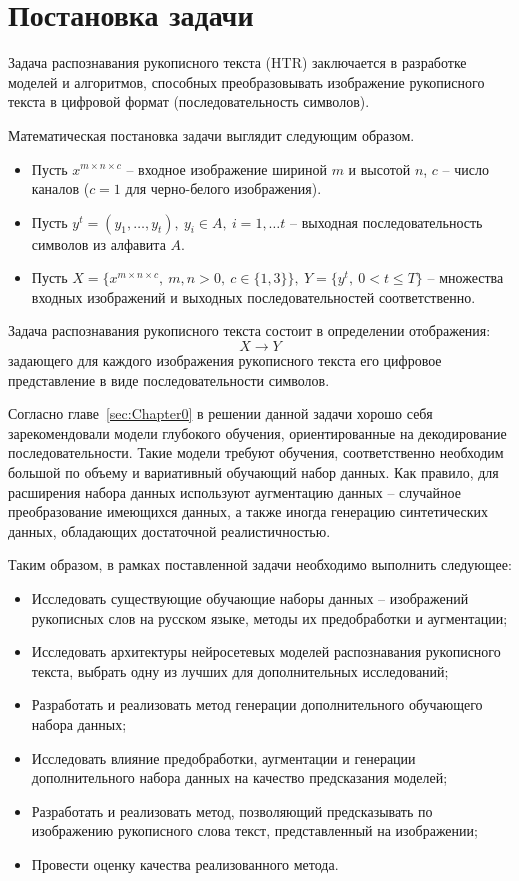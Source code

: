\section{Постановка задачи}
\label{sec:Chapter1} 

Задача распознавания рукописного текста (HTR) заключается в разработке моделей и алгоритмов,
способных преобразовывать изображение рукописного текста в цифровой формат (последовательность символов).

Математическая постановка задачи выглядит следующим образом.

\begin{itemize}
    \item[] Пусть $x^{m \times n \times c}$ -- входное изображение шириной $m$ и высотой $n$, $c$ -- число каналов ($c=1$ для черно-белого изображения).
    \item[] Пусть $y^t=(y_1,\dots,y_t),~y_i \in A,~i=1,\dots t$ -- выходная последовательность символов из алфавита $A$.
    \item[] Пусть $X=\{x^{m \times n \times c},~m,n>0,~c\in\{1,3\}\},~Y=\{y^t,~0<t\leqslant T\}$ -- множества входных изображений и выходных последовательностей соответственно.
\end{itemize}

Задача распознавания рукописного текста состоит в определении отображения:
\[ X \rightarrow Y \]
задающего для каждого изображения рукописного текста его цифровое представление в виде последовательности символов.

Согласно главе~\ref{sec:Chapter0} в решении данной задачи хорошо себя зарекомендовали модели глубокого обучения,
ориентированные на декодирование последовательности.
Такие модели требуют обучения, соответственно необходим большой по объему и вариативный обучающий набор данных.
Как правило, для расширения набора данных используют аугментацию данных -- случайное преобразование имеющихся данных,
а также иногда генерацию синтетических данных, обладающих достаточной реалистичностью.

Таким образом, в рамках поставленной задачи необходимо выполнить следующее:
\begin{itemize}
    \item Исследовать существующие обучающие наборы данных -- изображений рукописных слов на русском языке, методы их предобработки и аугментации;
    \item Исследовать архитектуры нейросетевых моделей распознавания рукописного текста, выбрать одну из лучших для дополнительных исследований;
    \item Разработать и реализовать метод генерации дополнительного обучающего набора данных;
    \item Исследовать влияние предобработки, аугментации и генерации дополнительного набора данных на качество предсказания моделей;
    \item Разработать и реализовать метод, позволяющий предсказывать по изображению рукописного слова текст, представленный на изображении;
    \item Провести оценку качества реализованного метода.
\end{itemize}
